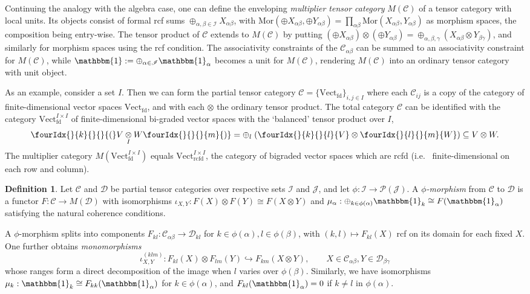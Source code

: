 \documentclass[10pt]{article}
\DeclareMathOperator{\fin}{\mathrm{fd}}
\DeclareMathOperator{\rcf}{\mathrm{rcfd}}
\newcommand{\CatC}{\mathcal{C}}
\newcommand{\CatD}{\mathcal{D}}
\newcommand{\CatCC}{\mathscr{C}}
\newcommand{\CatDD}{\mathscr{D}}
\newcommand{\Vectif}{\mathrm{Vect}^{I\times I}_{\fin}}
\newcommand{\Vectrcf}{\mathrm{Vect}^{I\times I}_{\rcf}}
\newcommand{\Mor}{\mathrm{Mor}}
\newcommand{\itimes}{\underset{I}{\otimes}}
\newcommand{\Vect}{\mathrm{Vect}}
\newcommand{\Unitb}{\mathbbm{1}}
\newcommand{\Gr}[5]{\fourIdx{#2}{#4}{#3}{#5}{#1}}%
\newcommand{\Gru}[3]{\Gr{#1}{}{}{#2}{#3}}
\theoremstyle{definition}
\newtheorem{Def}[Theorem]{Definition}
\numberwithin{equation}{section}
\begin{document}
Continuing the analogy with the algebra case, one can define the enveloping \emph{multiplier tensor category} $M(\CatC)$ of a tensor category with local units. Its objects consist of formal rcf sums $\oplus_{\alpha,\beta\in \mathscr{I}} X_{\alpha\beta}$, with $\Mor(\oplus X_{\alpha\beta},\oplus Y_{\alpha\beta}) =\prod_{\alpha\beta} \Mor(X_{\alpha\beta},Y_{\alpha\beta})$ as morphism spaces, the composition being entry-wise. The tensor product of $\CatC$ extends to $M(\CatC)$ by putting $\left(\oplus X_{\alpha\beta}\right)\otimes \left(\oplus Y_{\alpha\beta}\right) = \oplus_{\alpha,\beta,\gamma} \left(X_{\alpha\beta}\otimes Y_{\beta\gamma}\right)$, and similarly for morphism spaces using the rcf condition. The associativity constraints of the $\CatC_{\alpha\beta}$ can be summed to an associativity constraint for $M(\CatC)$, while $\Unitb := \oplus_{\alpha\in \mathscr{I}} \Unitb_\alpha$ becomes a unit for $M(\CatC)$, rendering $M(\CatC)$ into an ordinary tensor category with unit object.



As an example, consider a set $I$. Then we can form the partial tensor category $\CatCC = \{\Vect_{\fin}\}_{i,j\in I}$ where each $\CatC_{ij}$ is a copy of the category of finite-dimensional vector spaces $\Vect_{\fin}$, and with each $\otimes$ the ordinary tensor product. The total category $\CatC$ can be identified with the category $\Vectif$ of finite-dimensional bi-graded vector spaces with the `balanced' tensor product over $I$,  \[\Gru{(}{k}{}V\itimes W\Gru{)}{}{m} = \oplus_l \;(\Gru{V}{k}{l}\otimes \Gru{W}{l}{m})\subseteq V\otimes W.\] The multiplier category $M(\Vectif)$ equals $\Vectrcf$, the category of bigraded vector spaces which are rcfd (i.e.~ finite-dimensional on each row and column).

\begin{Def} Let $\CatCC$ and $\CatDD$ be partial tensor categories over respective sets $\mathscr{I}$ and $\mathscr{J}$, and let $\phi: \mathscr{I}\rightarrow \mathscr{P}(\mathscr{J})$. A \emph{$\phi$-morphism} from $\mathscr{C}$ to $\mathscr{D}$ is a functor $F:\CatC \rightarrow M(\CatD)$ with isomorphisms $\iota_{X,Y}:F(X)\otimes F(Y)\cong F(X\otimes Y)$ and $\mu_\alpha:\oplus_{k\in \phi(\alpha)} \Unitb_k \cong F(\Unitb_\alpha)$ satisfying the natural coherence conditions. 
\end{Def}

A $\phi$-morphism splits into components $F_{kl}: \CatC_{\alpha\beta} \rightarrow \CatD_{kl}$ for $k\in\phi(\alpha),l\in \phi(\beta)$, with $(k,l)\mapsto F_{kl}(X)$ rcf on its domain for each fixed $X$. One further obtains \emph{monomorphisms} \[\iota^{(klm)}_{X,Y}:F_{kl}(X) \otimes F_{lm}(Y) \hookrightarrow F_{km}(X\otimes Y), \qquad X\in \CatC_{\alpha\beta},Y\in \CatD_{\beta\gamma}\] whose ranges form a direct decomposition of the image when $l$ varies over $\phi(\beta)$. Similarly, we have isomorphisms $\mu_{k}:  \Unitb_k \cong F_ {kk}(\Unitb_{\alpha})$ for $k\in \phi(\alpha)$, and $F_{kl}(\Unitb_{\alpha})= 0$ if $k\neq l$ in $\phi(\alpha)$.
\end{document}
